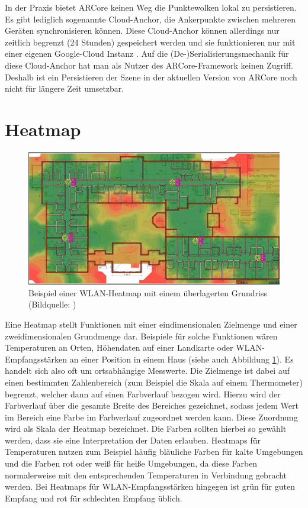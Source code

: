 \documentclass[10pt]{scrartcl}
\begin{document}
In der Praxis bietet ARCore keinen Weg die Punktewolken lokal zu persistieren. Es gibt lediglich sogenannte Cloud-Anchor, die Ankerpunkte zwischen mehreren Geräten synchronisieren können. Diese Cloud-Anchor können allerdings nur zeitlich begrenzt (24 Stunden) gespeichert werden und sie funktionieren nur mit einer eigenen Google-Cloud Instanz \cite[vgl.][]{cloud2018}. Auf die (De\nobreakdash-)Serialisierungsmechanik für diese Cloud-Anchor hat man als Nutzer des ARCore-Framework keinen Zugriff. Deshalb ist ein Persistieren der Szene in der aktuellen Version von ARCore noch nicht für längere Zeit umsetzbar.

\section{Heatmap}
\begin{figure}
\centering
\includegraphics[scale=0.7]{images/wifi_heatmap.jpg}
\caption{\label{img:heatmap}Beispiel einer WLAN-Heatmap mit einem überlagerten Grundriss (Bildquelle: \cite{exheatmap})}
\end{figure}
Eine Heatmap stellt Funktionen mit einer eindimensionalen Zielmenge und einer zweidimensionalen Grundmenge dar. Beispiele für solche Funktionen wären Temperaturen an Orten, Höhendaten auf einer Landkarte oder WLAN-Empfangsstärken an einer Position in einem Haus (siehe auch Abbildung \ref{img:heatmap}). Es handelt sich also oft um ortsabhängige Messwerte. Die Zielmenge ist dabei auf einen bestimmten Zahlenbereich (zum Beispiel die Skala auf einem Thermometer) begrenzt, welcher dann auf einen Farbverlauf bezogen wird. Hierzu wird der Farbverlauf über die gesamte Breite des Bereiches gezeichnet, sodass jedem Wert im Bereich eine Farbe im Farbverlauf zugeordnet werden kann. Diese Zuordnung wird als Skala der Heatmap bezeichnet. Die Farben sollten hierbei so gewählt werden, dass sie eine Interpretation der Daten erlauben. Heatmaps für Temperaturen nutzen zum Beispiel häufig bläuliche Farben für kalte Umgebungen und die Farben rot oder weiß für heiße Umgebungen, da diese Farben normalerweise mit den entsprechenden Temperaturen in Verbindung gebracht werden. Bei Heatmaps für WLAN-Empfangsstärken hingegen ist grün für guten Empfang und rot für schlechten Empfang üblich.
\end{document}
